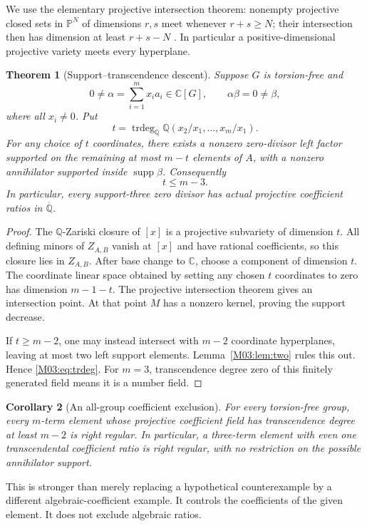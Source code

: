 \documentclass[11pt,a4paper,oneside]{report}
\newtheorem{theorem}{Theorem}[section]
\newtheorem{corollary}[theorem]{Corollary}
\theoremstyle{definition}
\theoremstyle{remark}
\DeclareMathOperator{\supp}{supp}
\DeclareMathOperator{\trdeg}{trdeg}
\newcommand{\C}{\mathbb C}
\newcommand{\Q}{\mathbb Q}
\newcommand{\Qbar}{\overline{\mathbb Q}}
\newcommand{\PP}{\mathbb P}
\begin{document}
We use the elementary projective intersection theorem: nonempty projective closed sets in \(\PP^N\) of dimensions \(r,s\) meet whenever \(r+s\ge N\); their intersection then has dimension at least \(r+s-N\) \cite[Lemma 33.34.3]{B:StacksProjective}. In particular a positive-dimensional projective variety meets every hyperplane.

\begin{theorem}[Support--transcendence descent]\label{M03:thm:trdeg}
Suppose \(G\) is torsion-free and
\[
0\ne\alpha=\sum_{i=1}^m x_i a_i\in\C[G],\qquad
\alpha\beta=0\ne\beta,
\]
where all \(x_i\ne0\). Put
\[
t=\trdeg_{\Q}\Q(x_2/x_1,\ldots,x_m/x_1).
\]
For any choice of \(t\) coordinates, there exists a nonzero zero-divisor left factor supported on the remaining at most \(m-t\) elements of \(A\), with a nonzero annihilator supported inside \(\supp\beta\). Consequently
\begin{equation}\label{M03:eq:trdeg}
\boxed{t\le m-3.}
\end{equation}
In particular, every support-three zero divisor has \emph{actual} projective coefficient ratios in \(\Qbar\).
\end{theorem}
\begin{proof}
The \(\Q\)-Zariski closure of \([x]\) is a projective subvariety of dimension \(t\). All defining minors of \(Z_{A,B}\) vanish at \([x]\) and have rational coefficients, so this closure lies in \(Z_{A,B}\). After base change to \(\C\), choose a component of dimension \(t\). The coordinate linear space obtained by setting any chosen \(t\) coordinates to zero has dimension \(m-1-t\). The projective intersection theorem gives an intersection point. At that point \(M\) has a nonzero kernel, proving the support decrease.

If \(t\ge m-2\), one may instead intersect with \(m-2\) coordinate hyperplanes, leaving at most two left support elements. Lemma~\ref{M03:lem:two} rules this out. Hence \eqref{M03:eq:trdeg}. For \(m=3\), transcendence degree zero of this finitely generated field means it is a number field.
\end{proof}

\begin{corollary}[An all-group coefficient exclusion]\label{M03:cor:transcoeff}
For every torsion-free group, every \(m\)-term element whose projective coefficient field has transcendence degree at least \(m-2\) is right regular. In particular, a three-term element with even one transcendental coefficient ratio is right regular, with no restriction on the possible annihilator support.
\end{corollary}
This is stronger than merely replacing a hypothetical counterexample by a different algebraic-coefficient example. It controls the coefficients of the given element. It does not exclude algebraic ratios.
\end{document}
